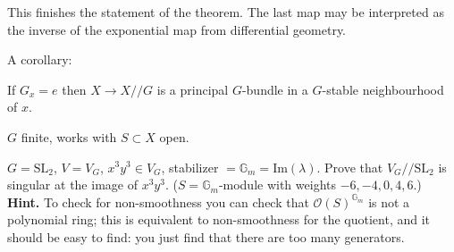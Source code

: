 This finishes the statement of the theorem. The last map may be interpreted as
the inverse of the exponential map from differential geometry.

A corollary:

\begin{lemma}
\label{lemma-}
If $G_x=e$ then $X \to X//G$ is a principal $G$-bundle in a $G$-stable
neighbourhood of $x$.
\end{lemma}

\begin{exercise}
\label{exercise-also-works-for-G-finite-and-S-open}
$G$ finite, works with $S\subset X$ open.
\end{exercise}

\begin{exercise}
\label{exercise-}
$G=\text{SL}_2$, $V=V_G$, $x^3y^3 \in V_G$, stabilizer
$=\mathbb{G}_m=\text{Im}(\lambda)$. Prove that $V_G//\text{SL}_2$ is singular at
the image of $x^3y^3$. ($S=\mathbb{G}_m$-module with weights $-6,-4,0,4,6$.)
{\bf Hint.} To
check for non-smoothness you can check that $\mathcal{O}(S)^{\mathbb{G}_m}$ is
not a polynomial ring; this is equivalent to non-smoothness for the quotient,
and it should be easy to find: you just find that there are too many generators.
\end{exercise}




